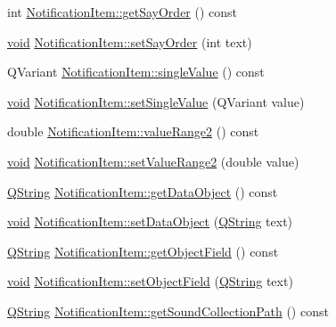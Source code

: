\begin{DoxyCompactItemize}
int \hyperlink{group___notify_plugin_ga395bd37d71abbcb58be1b077e0dd83f6}{\-Notification\-Item\-::get\-Say\-Order} () const 
\item 
\hyperlink{group___u_a_v_objects_plugin_ga444cf2ff3f0ecbe028adce838d373f5c}{void} \hyperlink{group___notify_plugin_ga0489a9c8b690360558e02eb562a34974}{\-Notification\-Item\-::set\-Say\-Order} (int text)
\item 
\-Q\-Variant \hyperlink{group___notify_plugin_ga2c73d25e5b3deadb7b7aec06957e91c5}{\-Notification\-Item\-::single\-Value} () const 
\item 
\hyperlink{group___u_a_v_objects_plugin_ga444cf2ff3f0ecbe028adce838d373f5c}{void} \hyperlink{group___notify_plugin_gacadb2d38a2a7d648f40454fd26f50ad8}{\-Notification\-Item\-::set\-Single\-Value} (\-Q\-Variant value)
\item 
double \hyperlink{group___notify_plugin_ga55c7c963b3a43675f58dfe2af221b0c2}{\-Notification\-Item\-::value\-Range2} () const 
\item 
\hyperlink{group___u_a_v_objects_plugin_ga444cf2ff3f0ecbe028adce838d373f5c}{void} \hyperlink{group___notify_plugin_gaf9a1d6d8fdc19a2e0124890e06fd3ee3}{\-Notification\-Item\-::set\-Value\-Range2} (double value)
\item 
\hyperlink{group___u_a_v_objects_plugin_gab9d252f49c333c94a72f97ce3105a32d}{\-Q\-String} \hyperlink{group___notify_plugin_gaf04fb4ac7c4882b581eb0ccb8808ba23}{\-Notification\-Item\-::get\-Data\-Object} () const 
\item 
\hyperlink{group___u_a_v_objects_plugin_ga444cf2ff3f0ecbe028adce838d373f5c}{void} \hyperlink{group___notify_plugin_gaa1ca305c3e8571f02153e8edabf0c6a3}{\-Notification\-Item\-::set\-Data\-Object} (\hyperlink{group___u_a_v_objects_plugin_gab9d252f49c333c94a72f97ce3105a32d}{\-Q\-String} text)
\item 
\hyperlink{group___u_a_v_objects_plugin_gab9d252f49c333c94a72f97ce3105a32d}{\-Q\-String} \hyperlink{group___notify_plugin_gabe5f556c91c61fb1b490fde2eb3ca0c8}{\-Notification\-Item\-::get\-Object\-Field} () const 
\item 
\hyperlink{group___u_a_v_objects_plugin_ga444cf2ff3f0ecbe028adce838d373f5c}{void} \hyperlink{group___notify_plugin_ga54c72d7ede2e6cc94ba5121c04f379f9}{\-Notification\-Item\-::set\-Object\-Field} (\hyperlink{group___u_a_v_objects_plugin_gab9d252f49c333c94a72f97ce3105a32d}{\-Q\-String} text)
\item 
\hyperlink{group___u_a_v_objects_plugin_gab9d252f49c333c94a72f97ce3105a32d}{\-Q\-String} \hyperlink{group___notify_plugin_ga02d674a0d98fc50edb96e8e487e4f247}{\-Notification\-Item\-::get\-Sound\-Collection\-Path} () const 

\end{DoxyCompactItemize}
